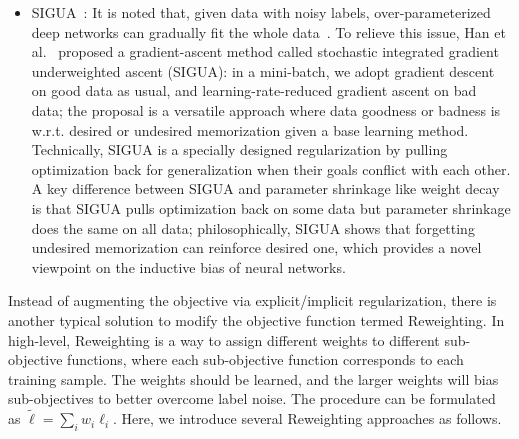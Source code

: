\begin{itemize}[leftmargin=*]
\begin{equation}\label{mixup}
\tilde{x} = \lambda x_i + (1-\lambda)x_j
\;\text{and}\;
\tilde{y} = \lambda y_i + (1-\lambda)y_j,
\end{equation}
where $(x_i,y_i)$ and $(x_j,y_j)$ are two examples randomly drawn from the training data and $\lambda \in [0,1]$ is a balanced parameter between two examples.
Intuitively, Mixup conducts virtual data augmentation, 
which dilutes the noise effects and smooths the data manifold. 
This simple but effective idea can be used in not only noisy labels but also adversarial examples, 
since the smoothness happens in both features and labels according to \eqref{mixup}.
\item SIGUA~: It is noted that, given data with noisy labels, 
over-parameterized deep networks can gradually fit the whole data~.
To relieve this issue, 
Han et al.~ proposed a gradient-ascent method called stochastic integrated gradient underweighted ascent (SIGUA): 
in a mini-batch, 
we adopt gradient descent on good data as usual, and learning-rate-reduced gradient ascent on bad data; 
the proposal is a versatile approach where data goodness or badness is w.r.t. desired or undesired memorization given a base learning method.
Technically, SIGUA is a specially designed regularization by pulling optimization back for generalization when their goals conflict with each other.
A key difference between SIGUA and parameter shrinkage like weight decay is that SIGUA pulls optimization back on some data but parameter shrinkage does the same on all data; philosophically, SIGUA shows that forgetting undesired memorization can reinforce desired one, which provides a novel viewpoint on the inductive bias of neural networks.
\end{itemize}

Instead of augmenting the objective via explicit/implicit regularization, 
there is another typical solution to modify the objective function termed Reweighting. 
In high-level,
Reweighting is a way to assign different weights to different sub-objective 
functions, where each sub-objective function corresponds to each training sample.
The weights should be learned, and the larger weights will bias sub-objectives to better overcome label noise. 
The procedure can be formulated as $\tilde{\ell} = \sum_i w_i\ell_i$. Here, we introduce several Reweighting approaches as follows.

